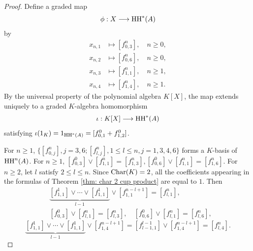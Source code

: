 \documentclass[10pt, reqno]{amsart}
\theoremstyle{definition}
\theoremstyle{remark}
\numberwithin{equation}{section}
\begin{document}
\begin{proof}
Define a graded map
\[
\phi:X\longrightarrow \mathrm{HH}^*(A)
\]
by
\[
\begin{aligned}
x_{n,1} &\longmapsto [f_{0,3}^n], \quad n \ge 0,\\
x_{n,2} &\longmapsto [f_{0,6}^n], \quad n \ge 0,\\
x_{n,3} &\longmapsto [f_{1,1}^n], \quad n \ge 1,\\
x_{n,4} &\longmapsto [f_{1,4}^n], \quad n \ge 1.
\end{aligned}
\]
By the universal property of the polynomial algebra \(K[X]\), the map extends uniquely to a graded \(K\)-algebra homomorphism
\[
\iota:K[X]\longrightarrow \mathrm{HH}^*(A)
\]
satisfying
\(
\iota(1_K)= 1_{\mathrm{HH}^*(A)}=[f_{0,1}^0+f_{1,2}^0]\).

For \( n\ge 1\), \(\{[f_{0,j}^n],j=3,6; [f_{l,j}^n], 1\le l \le n, j=1,3,4,6\} \) forms a \(K\)-basis of \(\mathrm{HH}^n(A) \).
For \(n\ge 1\), \( [f_{0,3}^0] \lor [f_{1,1}^n] = [f_{1,3}^n], [f_{0,6}^0] \lor [f_{1,1}^n] = [f_{1,6}^n]\).
For \( n\ge 2\), let $l$ satisfy \( 2\le l\le n\). Since \(\mathrm{Char}(K)=2\), all the coefficients appearing in the formulas of Theorem \ref{thm: char 2 cup product} are equal to \(1\). Then
$$\begin{aligned}
    &\underbrace{[f_{1,1}^1] \lor \cdots \lor [f_{1,1}^1]}_{l-1} \lor [f_{1,1}^{n-l+1}] = [f_{l,1}^n], \\
    & [f_{0,3}^0] \lor  [f_{l,1}^n] =  [f_{l,3}^n],\quad [f_{0,6}^0] \lor  [f_{l,1}^n] =  [f_{l,6}^n],
\end{aligned}$$
$$\underbrace{[f_{1,1}^1] \lor \cdots \lor [f_{1,1}^1]}_{l-1} \lor [f_{1,4}^{n-l+1}]= [f_{l-1,1}^{l-1}] \lor [f_{1,4}^{n-l+1}] = [f_{l,4}^n].$$


\end{proof}
\end{document}
